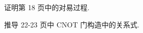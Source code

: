 \documentclass{assignment}
\begin{document}
\begin{prob}
    证明第 18 页中的对易过程.
\end{prob}
\begin{sol}
    
\end{sol}

\begin{prob}
    推导 22-23 页中 CNOT 门构造中的关系式.
\end{prob}
\begin{sol}
    
\end{sol}
\end{document}
